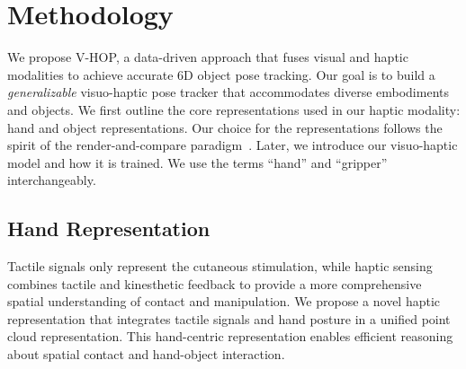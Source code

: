 \documentclass[11pt, a4paper, logo, twocolumn]{brown}
\newcommand{\shortname}{V-HOP\xspace}
\begin{document}
\section{Methodology}
We propose \shortname, a data-driven approach that fuses visual and haptic modalities to achieve accurate 6D object pose tracking.
Our goal is to build a \emph{generalizable} visuo-haptic pose tracker that accommodates diverse embodiments and objects. 
We first outline the core representations used in our haptic modality: hand and object representations.
Our choice for the representations follows the spirit of the render-and-compare paradigm~\cite{li_deepim_2018}.
Later, we introduce our visuo-haptic model and how it is trained.
We use the terms ``hand'' and ``gripper'' interchangeably.

\subsection{Hand Representation}
\label{sec: hand-representation}
Tactile signals only represent the cutaneous stimulation, while haptic sensing combines tactile and kinesthetic feedback to provide a more comprehensive spatial understanding of contact and manipulation. 
We propose a novel haptic representation that integrates tactile signals and hand posture in a unified point cloud representation.
This hand-centric representation enables efficient reasoning about spatial contact and hand-object interaction.
\end{document}
